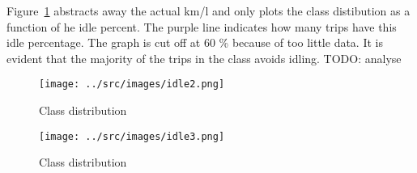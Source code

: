 Figure~\ref{fig:idleClassPercent} abstracts away the actual km/l and only plots the class distibution as a function of he idle percent. 
The purple line indicates how many trips have this idle percentage. 
The graph is cut off at 60 \% because of too little data.
It is evident that the majority of the trips in the \fuelHigh class avoids idling. 
TODO: analyse

\begin{figure}[htb]
\centering
\texttt{[image: ../src/images/idle2.png]}
\caption{Class distribution }
\label{fig:idleClassPercent}
\end{figure}

\begin{figure}[htb]
\centering
\texttt{[image: ../src/images/idle3.png]}
\caption{Class distribution}
\label{fig:idleClassTime}
\end{figure}

